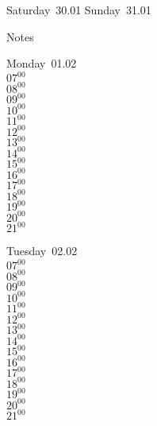 \documentclass[11pt,a4paper]{book}\usepackage[]{graphicx}\usepackage[]{color}
\begin{document}
\begin{weekendbox}
  Saturday~30.01
  \tcblower
  Sunday~31.01
\end{weekendbox} %
\begin{notebox}
  Notes
\end{notebox}
\clearpage
\begin{headerbox}
\end{headerbox}
\begin{weekdaybox}
  Monday~01.02\\
  { 
  \vfill
  $07^{00}$\\
$08^{00}$\\
$09^{00}$\\
$10^{00}$\\
$11^{00}$\\
$12^{00}$\\
$13^{00}$\\
$14^{00}$\\
$15^{00}$\\
$16^{00}$\\
$17^{00}$\\
$18^{00}$\\
$19^{00}$\\
$20^{00}$\\
$21^{00}$\\
  }
\end{weekdaybox}
\begin{weekdaybox}
  Tuesday~02.02\\
  { 
  \vfill
  $07^{00}$\\
$08^{00}$\\
$09^{00}$\\
$10^{00}$\\
$11^{00}$\\
$12^{00}$\\
$13^{00}$\\
$14^{00}$\\
$15^{00}$\\
$16^{00}$\\
$17^{00}$\\
$18^{00}$\\
$19^{00}$\\
$20^{00}$\\
$21^{00}$\\
  }
\end{weekdaybox}
\end{document}
